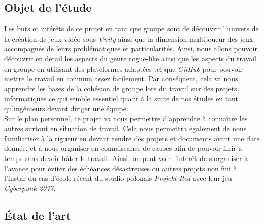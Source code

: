 \documentclass{article}
\begin{document}
\subsection{Objet de l'étude}

Les buts et intérêts de ce projet en tant que groupe sont de découvrir l'univers de la création de jeux vidéo sous \textit{Unity} ainsi que la dimension multijoueur des jeux accompagnés de leurs problématiques et particularités. Ainsi, nous allons pouvoir découvrir en détail les aspects du genre rogue-like ainsi que les aspects du travail en groupe en utilisant des plateformes adaptées tel que \textit{GitHub} pour pouvoir mettre le travail en commun assez facilement. Par conséquent, cela va nous apprendre les bases de la cohésion de groupe lors du travail sur des projets informatiques ce qui semble essentiel quant à la suite de nos études en tant qu'ingénieurs devant diriger une équipe. \\
Sur le plan personnel, ce projet va nous permettre d'apprendre à connaître les autres surtout en situation de travail. Cela nous permettra également de nous familiariser à la rigueur en devant rendre des projets et documents avant une date donnée, et à nous organiser en connaissance de causes afin de pouvoir finir à temps sans devoir hâter le travail. Ainsi, on peut voir l'intérêt de s'organiser à l'avance pour éviter des échéances désastreuses ou autres projets non fini à l'instar du cas d'école récent du studio polonais \textit{Projekt Red} avec leur jeu \textit{Cyberpunk 2077}.

\subsection{État de l'art}
\end{document}
